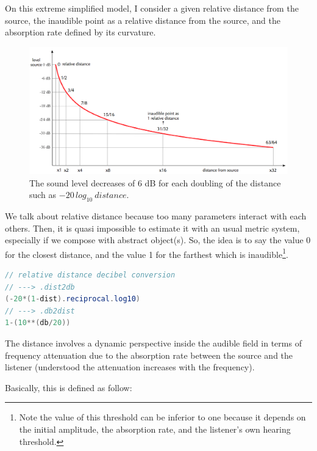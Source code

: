 \documentclass{book}
\begin{document}
\bigskip

On this extreme simplified model, I consider a given relative distance from the source, the inaudible point as a relative distance from the source, and the absorption rate defined by its curvature.

\begin{figure}[H]
\begin{center}
\includegraphics[width=\textwidth]{img/6355}
\caption{The sound level decreases of 6 dB for each doubling of the distance such as $-20\,log_{10}\: distance$.
}
\label{fig:dist}
\end{center}
\end{figure}

We talk about relative distance because too many parameters interact with each others. Then, it is quasi impossible to estimate it with an usual metric system, especially if we compose with abstract object(s). So, the idea is to say the value 0 for the closest distance, and the value 1 for the farthest which is inaudible\footnote{Note the value of this threshold can be inferior to one because it depends on the initial amplitude, the absorption rate, and the listener's own hearing threshold.}. 

\bigskip

\begin{lstlisting}[basicstyle=\footnotesize\ttfamily,language=java]
// relative distance decibel conversion
// ---> .dist2db
(-20*(1-dist).reciprocal.log10)
// ---> .db2dist
1-(10**(db/20))
\end{lstlisting}

\bigskip

The distance involves a dynamic perspective inside the audible field in terms of frequency attenuation due to the absorption rate between the source and the listener (understood the attenuation increases with the frequency). 

Basically, this is defined as follow:
\end{document}
